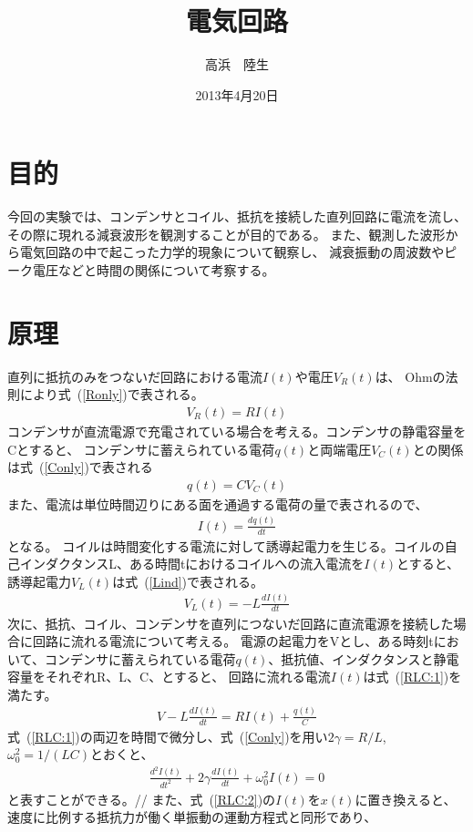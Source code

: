 \documentclass[a4j,10pt]{jarticle}
\title{電気回路}
\author{高浜　陸生}
\date{2013年4月20日}
\newcommand{\Equref}[1]{式~(\ref{#1})}
\begin{document}
\section{目的}
今回の実験では、コンデンサとコイル、抵抗を接続した直列回路に電流を流し、
その際に現れる減衰波形を観測することが目的である。
また、観測した波形から電気回路の中で起こった力学的現象について観察し、
減衰振動の周波数やピーク電圧などと時間の関係について考察する。
\section{原理}
直列に抵抗のみをつないだ回路における電流$I(t)$や電圧$V_{R}(t)$は、
Ohmの法則により\Equref{Ronly}で表される。
\begin{eqnarray}
\label{Ronly}
V_{R}(t)=RI(t)
\end{eqnarray}
コンデンサが直流電源で充電されている場合を考える。コンデンサの静電容量をCとすると、
コンデンサに蓄えられている電荷$q(t)$と両端電圧$V_{C}(t)$との関係は\Equref{Conly}で表される
\begin{eqnarray}
\label{Conly}
q(t)=CV_{C}(t)
\end{eqnarray}
また、電流は単位時間辺りにある面を通過する電荷の量で表されるので、
\begin{eqnarray}
I(t)=\frac{dq(t)}{dt}
\end{eqnarray}
となる。
コイルは時間変化する電流に対して誘導起電力を生じる。コイルの自己インダクタンスL、ある時間tにおけるコイルへの流入電流を$I(t)$とすると、
誘導起電力$V_{L}(t)$は\Equref{Lind}で表される。
\begin{eqnarray}
\label{Lind}
V_{L}(t)=-L\frac{dI(t)}{dt}
\end{eqnarray}
次に、抵抗、コイル、コンデンサを直列につないだ回路に直流電源を接続した場合に回路に流れる電流について考える。
電源の起電力をVとし、ある時刻tにおいて、コンデンサに蓄えられている電荷$q(t)$、抵抗値、インダクタンスと静電容量をそれぞれR、L、C、とすると、
回路に流れる電流$I(t)$は\Equref{RLC:1}を満たす。
\begin{eqnarray}
\label{RLC:1}
V-L\frac{dI(t)}{dt}=RI(t)+\frac{q(t)}{C}
\end{eqnarray}
\Equref{RLC:1}の両辺を時間で微分し、\Equref{Conly}を用い$2\gamma=R/L$,$\omega_{0}^{2}=1/(LC)$とおくと、
\begin{eqnarray}
\label{RLC:2}
\frac{d^2I(t)}{dt^{2}}+2\gamma\frac{dI(t)}{dt}+\omega_{0}^{2}I(t)=0
\end{eqnarray}
と表すことができる。//
また、\Equref{RLC:2}の$I(t)$を$x(t)$に置き換えると、速度に比例する抵抗力が働く単振動の運動方程式と同形であり、
\end{document}

